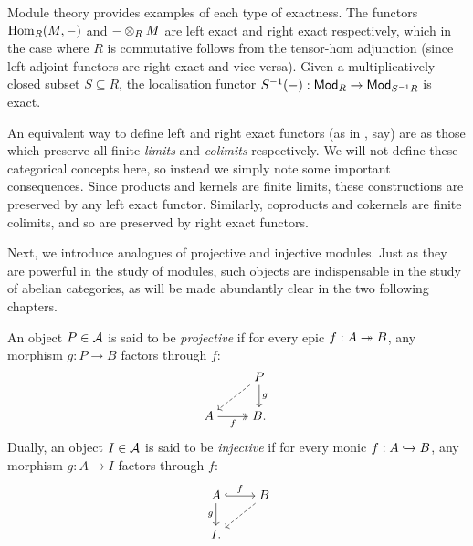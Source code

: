 \begin{example}
  \label{exmp_hom_is_left_exact}
  Module theory provides examples of each type of exactness.
  The functors $\Hom_R(M, -)$ and $- \tensor_R M$ are left exact and
  right exact respectively, which in the case where $R$ is
  commutative follows from the tensor-hom adjunction (since left
  adjoint functors are right exact and vice versa).
  Given a multiplicatively closed subset $S \subseteq R$, the
  localisation functor $\locln{(-)}{S}: \Mod{R} \to
  \Mod{\locln{R}{S}}$ is exact.
\end{example}

\begin{remark}
  \label{rem_exact_limit_colimit_pres}
  An equivalent way to define left and right exact functors (as in
    \cite[Section~VIII.3]{category_theory_for_the_working_mathematician},
  say) are as those which preserve all finite \emph{limits} and
  \emph{colimits} respectively.
  We will not define these categorical concepts here, so instead we
  simply note some important consequences.
  Since products and kernels are finite limits, these constructions
  are preserved by any left exact functor.
  Similarly, coproducts and cokernels are finite colimits, and so are
  preserved by right exact functors.
\end{remark}

Next, we introduce analogues of projective and injective modules.
Just as they are powerful in the study of modules, such objects are
indispensable in the study of abelian categories, as will be made
abundantly clear in the two following chapters.

\begin{definition}
  An object $P \in \abcat{A}$ is said to be \emph{projective} if for
  every epic $f: A \epi B$, any morphism $g: P \to B$ factors through $f$:
  \[
    \begin{tikzcd}[cramped]
      & P \\
      A & B.
      \arrow[dashed, from=1-2, to=2-1]
      \arrow["g", from=1-2, to=2-2]
      \arrow["f"', two heads, from=2-1, to=2-2]
    \end{tikzcd}
  \]
  Dually, an object $I \in \abcat{A}$ is said to be \emph{injective}
  if for every monic $f: A \mono B$, any morphism $g: A \to I$
  factors through $f$:
  \[
    \begin{tikzcd}[cramped]
      A & B \\
      I.
      \arrow["f", hook, from=1-1, to=1-2]
      \arrow["g"', from=1-1, to=2-1]
      \arrow[dashed, from=1-2, to=2-1]
    \end{tikzcd}
  \]
\end{definition}

